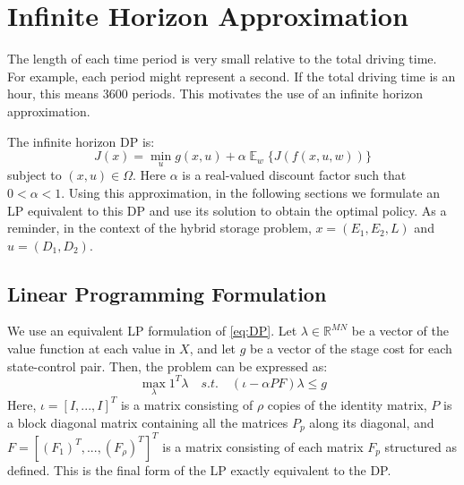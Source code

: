 \documentclass[conference]{IEEEtran}
\DeclareMathOperator{\E}{\mathbb{E}}
\begin{document}
\section{Infinite Horizon Approximation}
The length of each time period is very small relative to the total driving time. For example, each period might represent a second. If the total driving time is an hour, this means 3600 periods. This motivates the use of an infinite horizon approximation.

The infinite horizon DP is:
\begin{equation} \label{eq:DP}
J(x)=\min_{u} g(x,u) + \alpha\mathop{\E}_{w} \{J(f(x,u,w))\}
\end{equation} subject to $(x,u)\in\Omega$. Here $\alpha$ is a real-valued discount factor such that $0<\alpha<1$. Using this approximation, in the following sections we formulate an LP equivalent to this DP and use its solution to obtain the optimal policy. As a reminder, in the context of the hybrid storage problem, $x=(E_{1},E_{2},L)$ and $u=(D_{1},D_{2})$.


\subsection{Linear Programming Formulation}
We use an equivalent LP formulation of \eqref{eq:DP}. Let $\lambda\in\mathbb{R}^{MN}$ be a vector of the value function at each value in $X$, and let $g$ be a vector of the stage cost for each state-control pair. Then, the problem can be expressed as:
\begin{equation} \label{eq:LPfinal}
    \max_{\lambda} 1^{T} \lambda
    \hspace{1em}s.t.\hspace{1em}
    (\iota-\alpha PF)\lambda \leq g
\end{equation} Here, $\iota=[I,...,I]^{T}$ is a matrix consisting of $\rho$ copies of the identity matrix, $P$ is a block diagonal matrix containing all the matrices $P_{p}$ along its diagonal, and $F=[(F_{1})^{T},...,(F_{\rho})^{T}]^{T}$ is a matrix consisting of each matrix $F_{p}$ structured as defined. %
This is the final form of the LP exactly equivalent to the DP. 
\end{document}
